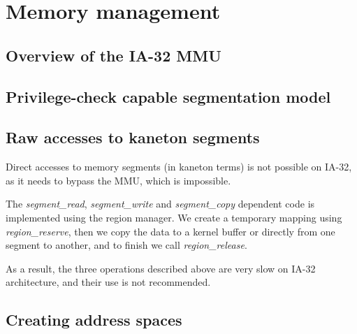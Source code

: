 
%
%

\chapter{Memory management}

\newpage

%
%

\section{Overview of the IA-32 MMU}

%
%

\section{Privilege-check capable segmentation model}

%
%

\section{Raw accesses to kaneton segments}

Direct accesses to memory segments (in kaneton terms) is not possible
on IA-32, as it needs to bypass the MMU, which is impossible.

The \textit{segment\_read}, \textit{segment\_write} and
\textit{segment\_copy} dependent code is implemented using the region
manager. We create a temporary mapping using \textit{region\_reserve},
then we copy the data to a kernel buffer or directly from one segment
to another, and to finish we call \textit{region\_release}.

As a result, the three operations described above are very slow on
IA-32 architecture, and their use is not recommended.

%
%

\section{Creating address spaces}

